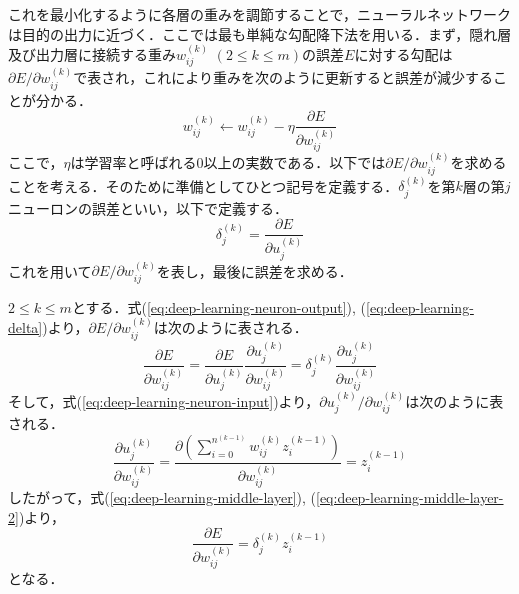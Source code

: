 これを最小化するように各層の重みを調節することで，ニューラルネットワークは目的の出力に近づく．ここでは最も単純な勾配降下法を用いる．まず，隠れ層及び出力層に接続する重み$w_{ij}^{(k)}$ $(2 \leq k \leq m)$の誤差$E$に対する勾配は$\partial E / \partial w_{ij}^{(k)}$で表され，これにより重みを次のように更新すると誤差が減少することが分かる．
\begin{equation}
  w_{ij}^{(k)} \leftarrow w_{ij}^{(k)} - \eta \frac{\partial E}{\partial w_{ij}^{(k)}}
  \label{eq:deep-learning-gradient-descent}
\end{equation}
ここで，$\eta$は学習率と呼ばれる$0$以上の実数である．以下では$\partial E / \partial w_{ij}^{(k)}$を求めることを考える．そのために準備としてひとつ記号を定義する．$\delta_j^{(k)}$を第$k$層の第$j$ニューロンの誤差といい，以下で定義する．
\begin{equation}
  \delta_j^{(k)} = \frac{\partial E}{\partial u_j^{(k)}}
  \label{eq:deep-learning-delta}
\end{equation}
これを用いて$\partial E / \partial w_{ij}^{(k)}$を表し，最後に誤差を求める．

$2 \leq k \leq m$とする．式(\ref{eq:deep-learning-neuron-output}), (\ref{eq:deep-learning-delta})より，$\partial E / \partial w_{ij}^{(k)}$は次のように表される．
\begin{equation}
  \frac{\partial E}{\partial w_{ij}^{(k)}} =
  \frac{\partial E}{\partial u_j^{(k)}} \frac{\partial u_j^{(k)}} {\partial w_{ij}^{(k)}} =
  \delta_j^{(k)} \frac{\partial u_j^{(k)}} {\partial w_{ij}^{(k)}}
  \label{eq:deep-learning-middle-layer}
\end{equation}
そして，式(\ref{eq:deep-learning-neuron-input})より，$\partial u_j^{(k)} / \partial w_{ij}^{(k)}$は次のように表される．
\begin{equation}
  \frac{\partial u_j^{(k)}} {\partial w_{ij}^{(k)}} =
  \frac{ \partial \left( \sum_{i=0}^{n^{(k-1)}} w_{ij}^{(k)} z_i^{(k-1)} \right)} {\partial w_{ij}^{(k)}} =
  z_i^{(k-1)}
  \label{eq:deep-learning-middle-layer-2}
\end{equation}
したがって，式(\ref{eq:deep-learning-middle-layer}), (\ref{eq:deep-learning-middle-layer-2})より，
\begin{equation}
  \frac{\partial E}{\partial w_{ij}^{(k)}} =
  \delta_j^{(k)} z_i^{(k-1)}
  \label{eq:deep-learning-middle-layer-3}
\end{equation}
となる．

